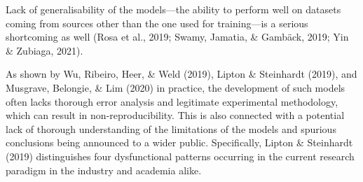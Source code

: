 \documentclass[
  10pt,
  dvipsnames,enabledeprecatedfontcommands]{scrartcl}
\begin{document}
Lack of
generalisability of the models---the ability to perform well on datasets
coming from sources other than the one used for training---is a serious
shortcoming as well (Rosa et al., 2019; Swamy, Jamatia, \& Gambäck,
2019; Yin \& Zubiaga, 2021).

As shown by Wu, Ribeiro, Heer, \& Weld (2019), Lipton \& Steinhardt
(2019), and Musgrave, Belongie, \& Lim (2020) in practice, the
development of such models often lacks thorough error analysis and
legitimate experimental methodology, which can result in
non-reproducibility. This is also connected with a potential lack of
thorough understanding of the limitations of the models and spurious
conclusions being announced to a wider public. Specifically, Lipton \&
Steinhardt (2019) distinguishes four dysfunctional patterns occurring in
the current research paradigm in the industry and academia alike.
\end{document}
